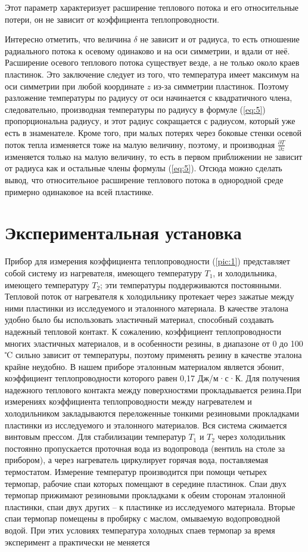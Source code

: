\documentclass[a4paper,11.5pt]{article} %
\begin{document}
Этот параметр характеризует расширение теплового потока и его
относительные потери, он не зависит от коэффициента теплопроводности.

Интересно отметить, что величина $\delta$ не зависит и от радиуса, то есть отношение радиального потока к осевому одинаково и на оси симметрии, и вдали от неё. Расширение осевого теплового потока существует везде, а не только около краев пластинок. Это заключение следует из того, что температура имеет максимум на оси симметрии при любой координате $z$ из-за симметрии пластинок. Поэтому разложение температуры по радиусу от оси начинается с квадратичного члена, следовательно, производная температуры по радиусу в формуле (\ref{eq:5}) пропорциональна радиусу, и этот радиус сокращается с радиусом, который уже есть в знаменателе. Кроме того, при малых потерях через боковые стенки осевой поток тепла изменяется тоже на малую величину, поэтому, и производная $\frac{\partial T}{\partial z}$ изменяется только на малую величину, то есть в первом приближении не зависит от радиуса как и остальные члены формулы (\ref{eq:5}). Отсюда можно сделать вывод, что относительное расширение теплового потока в однородной среде примерно одинаковое на всей пластинке.

\section{Экспериментальная установка}

Прибор для измерения коэффициента теплопроводности (\ref{pic:1}) представляет собой систему из нагревателя, имеющего температуру $T_1$, и холодильника, имеющего температуру $T_2$; эти температуры поддерживаются постоянными. Тепловой поток от нагревателя к холодильнику протекает через зажатые
между ними пластинки из исследуемого и эталонного материала. В качестве эталона удобно было бы использовать эластичный материал, способный создавать надежный тепловой контакт. К сожалению, коэффициент теплопроводности многих эластичных материалов, и в особенности резины, в диапазоне от 0 до 100 ℃ сильно зависит от температуры, поэтому применять резину в качестве эталона крайне неудобно. В нашем приборе эталонным материалом является эбонит, коэффициент теплопроводности которого равен 0,17 Дж/м·с·К. Для получения надежного теплового контакта между поверхностями прокладывается резина.При измерениях коэффициента теплопроводности между нагревателем и холодильником закладываются переложенные тонкими резиновыми прокладками пластинки из исследуемого и эталонного материалов. Вся система сжимается винтовым прессом.
Для стабилизации температур $T_1$ и $T_2$ через холодильник постоянно пропускается проточная вода из водопровода (вентиль на столе за прибором), а через нагреватель циркулирует горячая вода, поставляемая термостатом. Измерение температур производится при помощи четырех термопар, рабочие спаи которых помещают в середине пластинок. Спаи двух термопар прижимают резиновыми прокладками к обеим сторонам эталонной пластинки, спаи двух других -- к пластинке из исследуемого материала. Вторые спаи термопар помещены в пробирку с маслом, омываемую водопроводной водой. При этих условиях температура холодных спаев термопар за время эксперимент а практически не меняется
\end{document}
